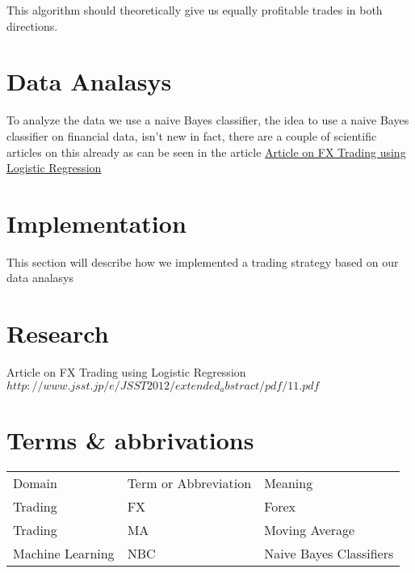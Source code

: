 \documentclass[10pt]{IEEEtran}
\begin{document}
This algorithm should theoretically give us equally profitable trades in both directions.

\section{Data Analasys}
To analyze the data we use a naive Bayes classifier, the idea to use a naive Bayes classifier on financial data, isn't new in fact, there are a couple of scientific articles on this already as can be seen in the article \href{http://www.jsst.jp/e/JSST2012/extended_abstract/pdf/11.pdf}{Article on FX Trading using Logistic Regression}



\section{Implementation}
This section will describe how we implemented a trading strategy based on our data analasys 


\section{Research}
Article on FX Trading using Logistic Regression
$http://www.jsst.jp/e/JSST2012/extended_abstract/pdf/11.pdf$

\section{Terms \& abbrivations}

\begin{tabular}{l | l | l}
Domain & Term or Abbreviation &  Meaning  \\
Trading & FX & Forex \\ 
Trading & MA & Moving Average\\
Machine Learning & NBC & Naive Bayes Classifiers\\
\end{tabular}
\end{document}
